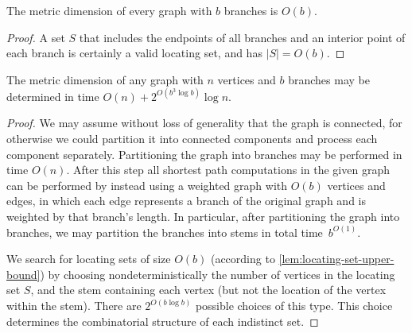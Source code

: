 \documentclass{jgaa-art}
\begin{document}
\begin{lemma}
\label{lem:locating-set-upper-bound}
The metric dimension of every graph with $b$ branches is $O(b)$.
\end{lemma}

\begin{proof}
A set $S$ that includes the endpoints of all branches and an interior point of each branch is certainly a valid locating set, and has $|S|=O(b)$.
\end{proof}

\begin{theorem}
The metric dimension of any graph with $n$ vertices and $b$ branches may be determined in time $O(n)+2^{O(b^3\log b)}\log n$.
\end{theorem}

\begin{proof}
We may assume without loss of generality that the graph is connected, for otherwise we could partition it into connected components and process each component separately.
Partitioning the graph into branches may be performed in time $O(n)$. After this step all shortest path computations in the given graph can be performed by instead using a weighted graph with $O(b)$ vertices and edges, in which each edge represents a branch of the original graph and is weighted by that branch's length. In particular, after partitioning the graph into branches, we may partition the branches into stems in total time~$b^{O(1)}$.

We search for locating sets of size $O(b)$ (according to \autoref{lem:locating-set-upper-bound})
by choosing nondeterministically the number of vertices in the locating set $S$, and the stem containing each vertex (but not the location of the vertex within the stem). There are $2^{O(b\log b)}$ possible choices of this type. This choice determines the combinatorial structure of each indistinct set.


\end{proof}
\end{document}
